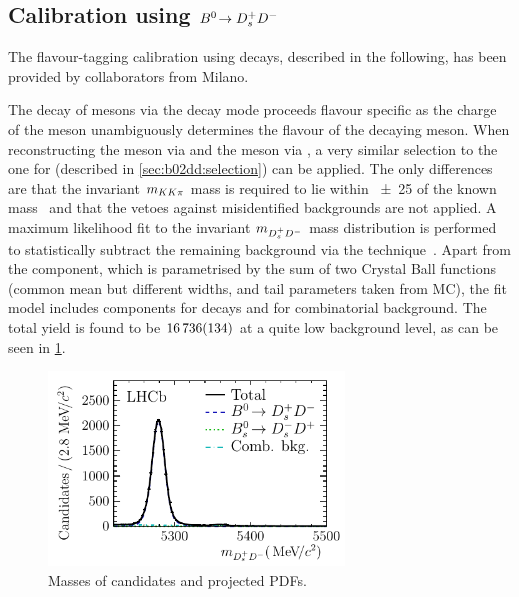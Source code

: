 
\subsection[Calibration using \texorpdfstring{$\BdToDsD$}{Bd2DsD}]{Calibration using \texorpdfstring{$\BdToDsD$}{Bd2DsD}}
\label{sec:dataanalysis:taggingcalibration:dsdcalibration}

The flavour-tagging calibration using \BdToDsD decays, described in the
following, has been provided by collaborators from Milano.

The decay of \Bd mesons via the decay mode \BdToDsD proceeds flavour specific
as the charge of the \Dsp meson unambiguously determines the flavour of the
decaying \Bd meson. When reconstructing the \Dsp meson via \DspToKKpi and the
\Dp meson via \DpToKpipi, a very similar selection to the one for \BdToDD
(described in \cref{sec:b02dd:selection}) can be applied. The only differences
are that the invariant $m_{KK\pi}$ mass is required to lie within
\SI{\pm25}{\MeVcc} of the known \Dsp mass~\cite{PDG2014} and that the vetoes
against misidentified backgrounds are not applied. A maximum likelihood fit to
the invariant $m_{{{D}^+_{s}}{{D}^-}}$ mass distribution is performed to statistically
subtract the remaining background via the \SPlot technique~\cite{Pivk:2004ty}.
Apart from the \BdToDsD component, which is parametrised by the sum of two
Crystal Ball functions (common mean but different widths, and tail parameters
taken from MC), the fit model includes components for \BsToDsD decays and for
combinatorial background. The total \BdToDsD yield is found to be
$\num{16736\pm134}$ at a quite low background level, as can be seen in
\cref{fig:dataanalysis:taggingcalibration:dsdcalibration:mass}.

\begin{figure}[htb]
\centering
\includegraphics[width=0.7\textwidth]{05-DataAnalysis/tikz/pdf/DsD_MassFit.pdf}
\caption{Masses of \BdToDsD candidates and projected PDFs.}
\label{fig:dataanalysis:taggingcalibration:dsdcalibration:mass}
\end{figure}

